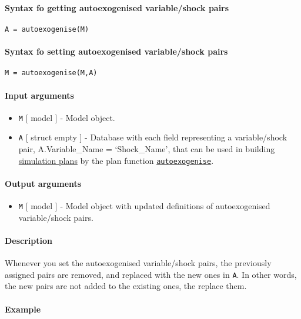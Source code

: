 


	\paragraph{Syntax fo getting autoexogenised variable/shock
pairs}\label{syntax-fo-getting-autoexogenised-variableshock-pairs}

\begin{verbatim}
A = autoexogenise(M)
\end{verbatim}

\paragraph{Syntax fo setting autoexogenised variable/shock
pairs}\label{syntax-fo-setting-autoexogenised-variableshock-pairs}

\begin{verbatim}
M = autoexogenise(M,A)
\end{verbatim}

\paragraph{Input arguments}\label{input-arguments}

\begin{itemize}
\item
  \texttt{M} {[} model {]} - Model object.
\item
  \texttt{A} {[} struct \textbar{} empty {]} - Database with each field
  representing a variable/shock pair, A.Variable\_Name = `Shock\_Name',
  that can be used in building \href{plan/Contents}{simulation plans} by
  the plan function \href{plan/autoexogenise}{\texttt{autoexogenise}}.
\end{itemize}

\paragraph{Output arguments}\label{output-arguments}

\begin{itemize}
\itemsep1pt\parskip0pt
\item
  \texttt{M} {[} model {]} - Model object with updated definitions of
  autoexogenised variable/shock pairs.
\end{itemize}

\paragraph{Description}\label{description}

Whenever you set the autoexogenised variable/shock pairs, the previously
assigned pairs are removed, and replaced with the new ones in
\texttt{A}. In other words, the new pairs are not added to the existing
ones, the replace them.

\paragraph{Example}\label{example}


